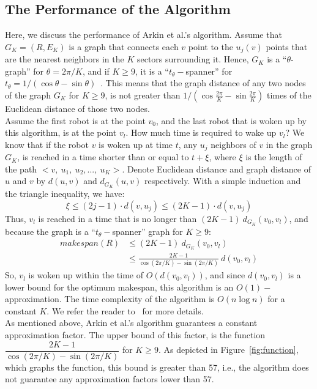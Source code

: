 \documentclass[review]{elsarticle}
\begin{document}
\subsection{The Performance of the Algorithm}
Here, we discuss the performance of Arkin et al.'s algorithm. Assume that $G_K=(R,E_K)$ is a graph that connects each $v$ point to the $u_j(v)$ points that are the nearest neighbors in the $K$ sectors surrounding it. Hence, $G_K$ is a ``$\theta$-graph'' for $\theta=2\pi/K$, and if $K\geq9$, it is a ``$t_\theta-$spanner'' for ${ t_\theta=1/(\cos\theta-\sin\theta) }$~\cite{Keil1992}.
This means that the graph distance of any two nodes of the graph $G_K$ for $K\geq9$, is not greater than ${ 1/(\cos\frac{2\pi}{K}-\sin\frac{2\pi}{K}) }$ times of the Euclidean distance of those two nodes. \\
Assume the first robot is at the point $v_0$, and the last robot that is woken up by this algorithm, is at the point $v_l$. How much time is required to wake up $v_l$? We know that if the robot $v$ is woken up at time $t$, any $u_j$ neighbors of $v$ in the graph $G_K$, is reached in a time shorter than or equal to $t+\xi$, where $\xi$ is the length of the path ${ <v,~u_1,~u_2,...,~u_K> }$. Denote Euclidean distance and graph distance of $u$ and $v$ by $d(u,v)$ and $d_{G_K}(u,v)$ respectively. With a simple induction and the triangle inequality, we have:
$$ \xi \leq (2j-1)\cdot d(v,u_j ) \leq (2K-1)\cdot d(v,u_j ) $$
Thus, $v_l$ is reached in a time that is no longer than $(2K-1)~d_{G_K}(v_0,v_l)$, and because the graph is a ``$t_\theta-$spanner'' graph for $K\geq9$:
\begin{align}
makespan(R)	&\leq (2K-1)~d_{G_K}(v_0,v_l) \nonumber \\
			&\leq \frac{2K-1}{\cos(2\pi/K)-\sin(2\pi/K)}~d(v_0,v_l) \nonumber
\end{align}
So, $v_l$ is woken up within the time of $O(d(v_0,v_l))$, and since $d(v_0,v_l)$ is a lower bound for the optimum makespan, this algorithm is an $O(1)-$approximation. The time complexity of the algorithm is $O(n\log n)$ for a constant $K$. We refer the reader to~\cite{Arkin2006} for more details.\\
As mentioned above, Arkin et al.'s algorithm guarantees a constant approximation factor. The upper bound of this factor, is the function $\dfrac{2K-1}{\cos(2\pi/K)-\sin(2\pi/K)}$ for $K\geq9$. As depicted in Figure~\ref{fig:function}, which graphs the function, this bound is greater than 57, i.e., the algorithm does not guarantee any approximation factors lower than 57.
\end{document}
